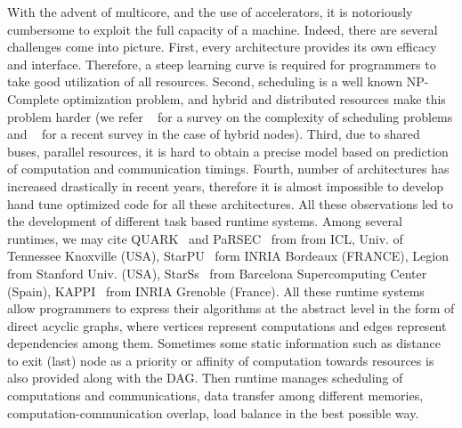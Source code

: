 \documentclass[runningheads]{llncs} %
\begin{document}
	With the advent of multicore, and the use of accelerators, it is notoriously cumbersome to exploit the full capacity of a machine. Indeed, there are several challenges come into picture. First, every architecture provides its own efficacy and interface. Therefore, a steep learning curve is required for programmers to take good utilization of all resources. Second, scheduling is a well known NP-Complete optimization problem, and hybrid and distributed resources make this problem harder (we refer ~\cite{webpagescheduling} for a survey on the complexity of scheduling problems and ~\cite{bleuse2015scheduling} for a recent survey in the case of hybrid nodes). Third, due to shared buses, parallel resources, it is hard to obtain a precise model based on prediction of computation and communication timings. Fourth, number of architectures has increased drastically in recent years, therefore it is almost impossible to develop hand tune optimized code for all these architectures. All these observations led to the development of different task based runtime systems. Among several runtimes, we may cite QUARK~\cite{YarKhan:2011:Quark:Manual} and PaRSEC~\cite{parsec} from from ICL, Univ. of Tennessee Knoxville (USA), StarPU~\cite{starpu} form INRIA Bordeaux (FRANCE), Legion~\cite{legion12} from Stanford Univ. (USA), StarSs~\cite{ompss} from Barcelona Supercomputing Center (Spain), KAPPI~\cite{kaapi} from INRIA Grenoble (France). All these runtime systems allow programmers to express their algorithms at the abstract level in the form of direct acyclic graphs, where vertices represent computations and edges represent dependencies among them. Sometimes some static information such as distance to exit (last) node as a priority or affinity of computation towards resources is also provided along with the DAG. Then runtime manages scheduling of computations and communications, data transfer among different memories, computation-communication overlap, load balance in the best possible way.  
		
		
\end{document}
